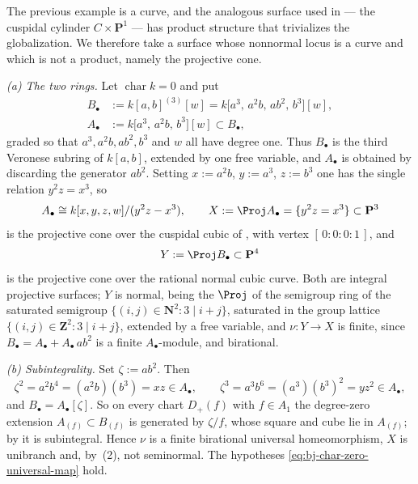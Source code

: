 \begin{example}
\label{ex:ch44-surface-end-to-end}
The previous example is a curve, and the analogous surface used in
 --- the cuspidal cylinder
$C\times\mathbf P^1$ --- has product structure that trivializes the
globalization.  We therefore take a surface whose nonnormal locus is a
curve and which is not a product, namely the projective cone.

\emph{(a) The two rings.}  Let $\operatorname{char}k=0$ and put
\[
 \begin{aligned}
  B_\bullet&:=k[a,b]^{(3)}[w]
    =k\bigl[a^3,\,a^2b,\,ab^2,\,b^3\bigr][w],\\
  A_\bullet&:=k\bigl[a^3,\,a^2b,\,b^3\bigr][w]
    \subset B_\bullet,
 \end{aligned}
\]
graded so that $a^3,a^2b,ab^2,b^3$ and $w$ all have degree one.  Thus
$B_\bullet$ is the third Veronese subring of $k[a,b]$, extended by one
free variable, and $A_\bullet$ is obtained by discarding the generator
$ab^2$.  Setting $x:=a^2b$, $y:=a^3$, $z:=b^3$ one has the single
relation $y^2z=x^3$, so
\[
 A_\bullet\cong k[x,y,z,w]/(y^2z-x^3),
 \qquad
 X:=\Proj A_\bullet=\{y^2z=x^3\}\subset\mathbf P^3
\]
is the projective cone over the cuspidal cubic of
, with vertex $[\,0:0:0:1\,]$, and
\[
 Y:=\Proj B_\bullet\subset\mathbf P^4
\]
is the projective cone over the rational normal cubic curve.  Both are
integral projective surfaces; $Y$ is normal, being the $\Proj$ of the
semigroup ring of the saturated semigroup
$\{(i,j)\in\mathbf N^2:3\mid i+j\}$, saturated in the group
lattice $\{(i,j)\in\mathbf Z^2:3\mid i+j\}$, extended by a free variable, and $\nu:Y\to X$ is
finite, since $B_\bullet=A_\bullet+A_\bullet\,ab^2$ is a finite
$A_\bullet$-module, and birational.

\emph{(b) Subintegrality.}  Set $\zeta:=ab^2$.  Then
\[
 \zeta^2=a^2b^4=(a^2b)(b^3)=xz\in A_\bullet,
 \qquad
 \zeta^3=a^3b^6=(a^3)(b^3)^2=yz^2\in A_\bullet,
\]
and $B_\bullet=A_\bullet[\zeta]$.  So on every chart $D_+(f)$ with
$f\in A_1$ the degree-zero extension $A_{(f)}\subset B_{(f)}$ is
generated by $\zeta/f$, whose square and cube lie in $A_{(f)}$; by
 it is subintegral.  Hence $\nu$ is a finite
birational universal homeomorphism, $X$ is unibranch and, by
\,(2), not seminormal.  The
hypotheses \eqref{eq:bj-char-zero-universal-map} hold.


\end{example}
